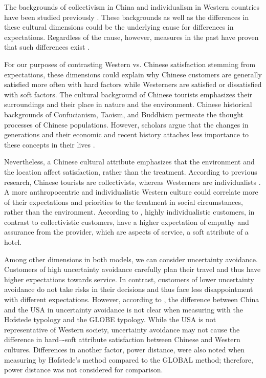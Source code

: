 \documentclass[smallextended,natbib]{svjour3}       %
\begin{document}
    The backgrounds of collectivism in China and individualism in Western countries have been studied previously \cite[][]{gao2017chinese}. These backgrounds as well as the differences in these cultural dimensions could be the underlying cause for differences in expectations. Regardless of the cause, however, measures in the past have proven that such differences exist \cite[][]{armstrong1997importance}. 

    For our purposes of contrasting Western vs. Chinese satisfaction stemming from expectations, these dimensions could explain why Chinese customers are generally satisfied more often with hard factors while Westerners are satisfied or dissatisfied with soft factors. The cultural background of Chinese tourists emphasizes their surroundings and their place in nature and the environment. Chinese historical backgrounds of Confucianism, Taoism, and Buddhism permeate the thought processes of Chinese populations. However, scholars argue that the changes in generations and their economic and recent history attaches less importance to these concepts in their lives \cite[][]{gao2017chinese}. 

    Nevertheless, a Chinese cultural attribute emphasizes that the environment and the location  affect satisfaction, rather than the treatment. According to previous research, Chinese tourists are collectivists, whereas Westerners are individualists \cite[][]{kim2000}. A more anthropocentric and individualistic Western culture could correlate more of their expectations and priorities to the treatment in social circumstances, rather than the environment. According to \cite{donthu1998cultural}, highly individualistic customers, in contrast to collectivistic customers, have a higher expectation of empathy and assurance from the provider, which are aspects of service, a soft attribute of a hotel.

    Among other dimensions in both models, we can consider uncertainty avoidance. Customers of high uncertainty avoidance carefully plan their travel and thus have higher expectations towards service. In contrast, customers of lower uncertainty avoidance do not take risks in their decisions and thus face less disappointment with different expectations. However, according to \cite{xiumei2011cultural}, the difference between China and the USA in uncertainty avoidance is not clear when measuring with the Hofstede typology and the GLOBE typology. While the USA is not representative of Western society, uncertainty avoidance may not cause the difference in hard–-soft attribute satisfaction between Chinese and Western cultures. Differences in another factor, power distance, were also noted when measuring by Hofstede's method compared to the GLOBAL method; therefore, power distance was not considered for comparison.
\end{document}
